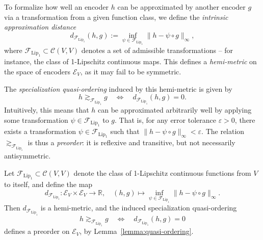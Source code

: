To formalize how well an encoder \( h \) can be approximated by another encoder \( g \) via a transformation from a given function class, we define the \emph{intrinsic approximation distance}
\[
d_{\mathcal{F}_{\text{Lip}_1}}(h, g) := \inf_{\psi \in  \mathcal{F}_{\mathrm{Lip}_1}} \| h - \psi \circ g \|_\infty,
\]
where \(\mathcal{F}_{\mathrm{Lip}_1}\subset \mathcal{C}(V, V) \) denotes a set of admissible transformations – for instance, the class of 1-Lipschitz continuous maps.
This defines a \emph{hemi-metric} on the space of encoders \( \mathcal{E}_V \), as it may fail to be symmetric.

The \emph{specialization quasi-ordering} induced by this hemi-metric is given by
\[
h \gtrsim_{ \mathcal{F}_{\mathrm{Lip}_1}} g \quad \Leftrightarrow \quad d_{\mathcal{F}_{\text{Lip}_1}}(h, g) = 0.
\]
Intuitively, this means that \( h \) can be approximated arbitrarily well by applying some transformation \( \psi \in  \mathcal{F}_{\mathrm{Lip}_1} \) to \( g \). That is, for any error tolerance \( \varepsilon > 0 \), there exists a transformation \( \psi \in \mathcal{F}_{\mathrm{Lip}_1} \) such that \( \| h - \psi \circ g \|_\infty < \varepsilon \). The relation \( \gtrsim_{ \mathcal{F}_{\mathrm{Lip}_1}} \) is thus a \emph{preorder}: it is reflexive and transitive, but not necessarily antisymmetric.


\begin{proposition}
	Let \( \mathcal{F}_{\text{Lip}_1} \subset \mathcal{C}(V, V) \) denote the class of 1-Lipschitz continuous functions from \( V \) to itself, and define the map
	\[
	d_{\mathcal{F}_{\text{Lip}_1}} : \mathcal{E}_V \times \mathcal{E}_V \to \mathbb{R}, \quad (h, g) \mapsto \inf_{\psi \in \mathcal{F}_{\text{Lip}_1}} \| h - \psi \circ g \|_\infty.
	\]
	Then \( d_{\mathcal{F}_{\text{Lip}_1}} \) is a hemi-metric, and the induced specialization quasi-ordering
	\[
	h \gtrsim_{ \mathcal{F}_{\mathrm{Lip}_1}} g \quad \Longleftrightarrow \quad d_{\mathcal{F}_{\text{Lip}_1}}(h, g) = 0
	\]
	defines a preorder on \( \mathcal{E}_V \), by Lemma~\ref{lemma:quasi-ordering}.
\end{proposition}


